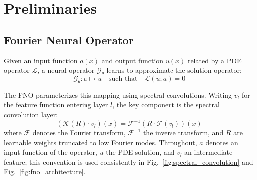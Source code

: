 \section{Preliminaries}
\label{sec:preliminaries}

\subsection{Fourier Neural Operator}

Given an input function $a(x)$ and output function $u(x)$ related by a PDE operator $\mathcal{L}$, a neural 
operator $\mathcal{G}_\theta$ learns to approximate the solution operator:
\begin{equation}
    \mathcal{G}_\theta: a \mapsto u \quad \text{such that} \quad \mathcal{L}(u; a) = 0
\end{equation}

The FNO parameterizes this mapping using spectral convolutions. Writing $v_l$ for the feature function entering
layer $l$, the key component is the spectral convolution layer:
\begin{equation}
    (\mathcal{K}(R) \cdot v_l)(x) = \mathcal{F}^{-1}\left( R \cdot \mathcal{F}(v_l) \right)(x)
\end{equation}
where $\mathcal{F}$ denotes the Fourier transform, $\mathcal{F}^{-1}$ the inverse transform, and $R$ are learnable weights truncated to low Fourier modes. Throughout, $a$ denotes an input function of the operator, $u$ the PDE solution, and $v_l$ an intermediate feature; this convention is used consistently in Fig.~\ref{fig:spectral_convolution} and Fig.~\ref{fig:fno_architecture}.

